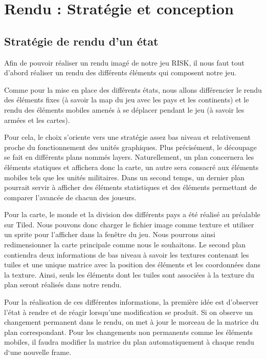 \section{Rendu : Stratégie et conception}

\subsection{Stratégie de rendu d'un état}

Afin de pouvoir réaliser un rendu imagé de notre jeu RISK, il nous faut tout d’abord réaliser un rendu des différents éléments qui composent notre jeu. 

Comme pour la mise en place des différents états, nous allons différencier le rendu des éléments fixes (à savoir la map du jeu avec les pays et les continents) et le rendu des éléments mobiles amenés à se déplacer pendant le jeu (à savoir les armées et les cartes). 

Pour cela, le choix s'oriente vers une stratégie assez bas niveau et relativement proche du fonctionnement des unités graphiques. Plus précisément, le découpage se fait en différents plans nommés layers. Naturellement, un plan concernera les éléments statiques et affichera donc la carte, un autre sera consacré aux éléments mobiles tels que les unités militaires. Dans un second temps, un dernier plan pourrait servir à afficher des éléments statistiques et des éléments permettant de comparer l'avancée de chacun des joueurs.

Pour la carte, le monde et la division des différents pays a été réalisé au préalable sur Tiled. Nous pouvons donc charger le fichier image comme texture et utiliser un sprite pour l'afficher dans la fenêtre du jeu. Nous pourrons ainsi redimensionner la carte principale comme nous le souhaitons.
Le second plan contiendra deux informations de bas niveau à savoir les textures contenant les tuiles et une unique matrice avec la position des éléments et les coordonnées dans la texture. Ainsi, seuls les éléments dont les tuiles sont associées à la texture du plan seront réalisés dans notre rendu. 

Pour la réalisation de ces différentes informations, la première idée est d’observer l’état à rendre et de réagir lorsqu’une modification se produit. Si on observe un changement permanent dans le rendu, on met à jour le morceau de la matrice du plan correspondant. Pour les changements non permanents comme les éléments mobiles, il faudra modifier la matrice du plan automatiquement à chaque rendu d‘une nouvelle frame.


